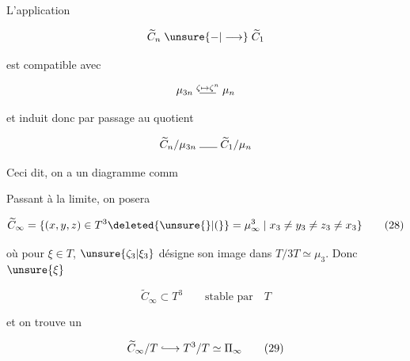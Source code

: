 
L'application

\[
\widetilde C_n\mathrel{\unsure{-|\longrightarrow}}\widetilde C_1
\]

est compatible avec

\[
\mu_{3n}\mathrel{\overset{\zeta\mapsto\zeta^n}{\rule{1.5em}{0.4pt}}}\mu_{n}
\]

et induit donc par passage au quotient

\[
\widetilde C_n/\mu_{3n}\mathrel{\rule{1.6em}{0.4pt}}\widetilde C_1/\mu_n
\]

Ceci dit, on a un diagramme comm


Passant à la limite, on posera

\[
\widetilde C_\infty=\{(x,y,z)\in T^3\deleted{\unsure{\}|(}}= \mu_\infty^3\mid x_3\ne y_3\ne z_3\ne x_3\}
\tag*{(28)}
\]

où pour $\xi\in T$, $\unsure{\zeta_3|\xi_3}$ désigne son image dans $T/3T\simeq\mu_3$. Donc $\unsure{\xi}$

\[
\widetilde C_\infty\subset T^3\qquad\text{stable par}\quad T
\]

et on trouve un

\[
\widetilde C_\infty/T\lhook\joinrel\longrightarrow T^3/T\simeq\Pi_\infty
\tag*{(29)}
\]


